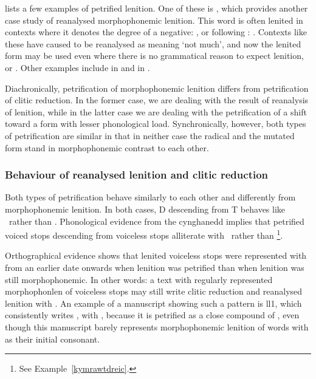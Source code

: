 \Textcite[448-451]{morgan_y_1952} lists a few examples of petrified lenition. One of these is , which provides another case study of reanalysed morphophonemic lenition. This word is often lenited in contexts where it denotes the degree of a negative: \eg {}, or following \oes: . Contexts like these have caused  to be reanalysed as meaning `not much', and now the lenited form may be used even where there is no grammatical reason to expect lenition, \eg {} or . Other examples include  in  and  in .

Diachronically, petrification of morphophonemic lenition differs from petrification of clitic reduction. 
In the former case, we are dealing with the result of reanalysis of lenition, while in the latter case we are dealing with the petrification of a shift toward a form with lesser phonological load. 
Synchronically, however, both types of petrification are similar in that in neither case the radical and the mutated form stand in morphophonemic contrast to each other. 

\subsubsection{Behaviour of reanalysed lenition and clitic reduction}
\label{sec:their-behaviour}
Both types of petrification behave similarly to each other and differently from morphophonemic lenition. 
In both cases, \gls{D} descending from \gls{T} behaves like \xD\ rather than \lT. Phonological evidence from the cynghanedd implies that petrified voiced stops descending from voiceless stops alliterate with \xD\ rather than \lT\footnote{See Example~\ref{kymrawtdreic}.}.

Orthographical evidence shows that lenited voiceless stops were represented with  from an earlier date onwards when lenition was petrified than when lenition was still morphophonemic. 
In other words: a text with regularly represented \gls{morphophonlen} of voiceless stops may still write clitic reduction and reanalysed lenition with . 
An example of a manuscript showing such a pattern is \gls{ll1}, which consistently writes , with , because it is petrified as a close compound of , even though this manuscript barely represents morphophonemic lenition of words with  as their initial consonant.

